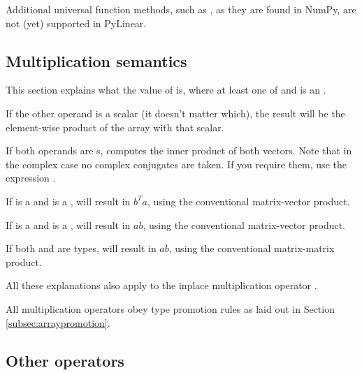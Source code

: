 Additional universal function methods, such as , as they are
found in NumPy, are not (yet) supported in PyLinear.

\subsection{Multiplication semantics}
\label{subsec:arraymultiplication}

This section explains what the value of  is, where at least
one of  and  is an .

If the other operand is a scalar (it doesn't matter which), the
result will be the element-wise product of the array with that scalar.

If both operands are s,  computes the inner
product of both vectors. Note that in the complex case no complex
conjugates are taken. If you require them, use the expression
.

If  is a  and  is a ,
 will result in $b^Ta$, using the conventional matrix-vector
product.

If  is a  and  is a ,
 will result in $a b$, using the conventional matrix-vector
product.

If both  and  are  types,
 will result in $a b$, using the conventional matrix-matrix
product.

All these explanations also apply to the inplace multiplication
operator \code{*=}.

All multiplication operators obey type promotion rules as laid out
in Section \ref{subsec:arraypromotion}.

\subsection{Other  operators}

